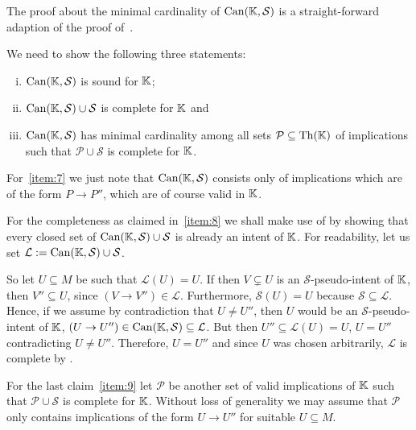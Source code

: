 The proof about the minimal cardinality of $\operatorname{Can}({\mathbb{K}}, \mathcal{S})$ is a
straight-forward adaption of the proof of~\cite[Theorem 3.8]{Diss-Felix}.

\begin{Proof}
  We need to show the following three statements:
  \begin{enumerate}[i. ]
  \item\label{item:7} $\operatorname{Can}({\mathbb{K}}, \mathcal{S})$ is sound for ${\mathbb{K}}$;
  \item\label{item:8} $\operatorname{Can}({\mathbb{K}}, \mathcal{S}) \cup \mathcal{S}$ is complete for ${\mathbb{K}}$ and
  \item\label{item:9} $\operatorname{Can}({\mathbb{K}}, \mathcal{S})$ has minimal cardinality among all sets
    $\mathcal{P} \subseteq \operatorname{Th}({\mathbb{K}})$ of implications such that $\mathcal{P} \cup
    \mathcal{S}$ is complete for ${\mathbb{K}}$.
  \end{enumerate}

  For~\ref{item:7} we just note that $\operatorname{Can}({\mathbb{K}}, \mathcal{S})$ consists only of
  implications which are of the form $P \to P''$, which are of course valid in ${\mathbb{K}}$.

  For the completeness as claimed in~\ref{item:8} we shall make use of
   by showing that every closed set of
  $\operatorname{Can}({\mathbb{K}}, \mathcal{S}) \cup \mathcal{S}$ is already an intent of ${\mathbb{K}}$.  For
  readability, let us set $\mathcal{L} := \operatorname{Can}({\mathbb{K}}, \mathcal{S}) \cup \mathcal{S}$.

  So let $U \subseteq M$ be such that $\mathcal{L}(U) = U$.  If then $V \subsetneq U$ is
  an $\mathcal{S}$-pseudo-intent of ${\mathbb{K}}$, then $V'' \subseteq U$, since $(V \to V'')
  \in \mathcal{L}$.  Furthermore, $\mathcal{S}(U) = U$ because $\mathcal{S} \subseteq
  \mathcal{L}$.  Hence, if we assume by contradiction that $U \neq U''$, then $U$ would be
  an $\mathcal{S}$-pseudo-intent of ${\mathbb{K}}$, \ie $(U \to U'') \in \operatorname{Can}({\mathbb{K}},
  \mathcal{S}) \subseteq \mathcal{L}$.  But then $U'' \subseteq \mathcal{L}(U) = U$, \ie
  $U = U''$ contradicting $U \neq U''$.  Therefore, $U = U''$ and since $U$ was chosen
  arbitrarily, $\mathcal{L}$ is complete by .

  For the last claim~\ref{item:9} let $\mathcal{P}$ be another set of valid implications
  of ${\mathbb{K}}$ such that $\mathcal{P} \cup \mathcal{S}$ is complete for ${\mathbb{K}}$.  Without
  loss of generality we may assume that $\mathcal{P}$ only contains implications of the
  form $U \to U''$ for suitable $U \subseteq M$.


\end{Proof}
